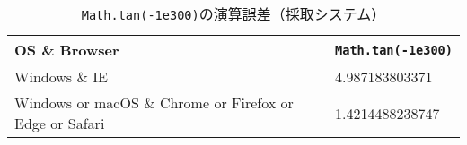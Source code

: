 \begin{table}[H]
    \begin{center}
    \caption{\texttt{Math.tan(-1e300)}の演算誤差（採取システム）}
    \label{tb-os_rst}
        \begin{tabularx}{\linewidth}{X|X}
        OS \& Browser & \texttt{Math.tan(-1e300)} \\ \hline\hline
        Windows \& IE & 4.987183803371 \\ \hline
        Windows or macOS \& Chrome or Firefox or Edge or Safari & 1.4214488238747 \\
        \end{tabularx}
    \end{center}
\end{table}